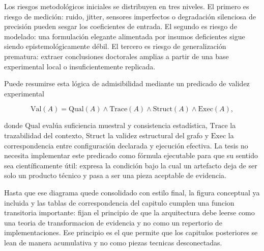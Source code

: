 Los riesgos metodológicos iniciales se distribuyen en tres niveles. El primero es riesgo de medición: ruido, jitter, sensores imperfectos o degradación silenciosa de precisión pueden sesgar los coeficientes de entrada. El segundo es riesgo de modelado: una formulación elegante alimentada por insumos deficientes sigue siendo epistemológicamente débil. El tercero es riesgo de generalización prematura: extraer conclusiones doctorales amplias a partir de una base experimental local o insuficientemente replicada.

Puede resumirse esta lógica de admisibilidad mediante un predicado de validez experimental

$$
\mathrm{Val}(A) = \mathrm{Qual}(A) \land \mathrm{Trace}(A) \land \mathrm{Struct}(A) \land \mathrm{Exec}(A),
$$

donde $\mathrm{Qual}$ evalúa suficiencia muestral y consistencia estadística, $\mathrm{Trace}$ la trazabilidad del contexto, $\mathrm{Struct}$ la validez estructural del grafo y $\mathrm{Exec}$ la correspondencia entre configuración declarada y ejecución efectiva. La tesis no necesita implementar este predicado como fórmula ejecutable para que su sentido sea científicamente útil: expresa la condición bajo la cual un artefacto deja de ser solo un producto técnico y pasa a ser una pieza aceptable de evidencia.


Hasta que ese diagrama quede consolidado con estilo final, la figura conceptual ya incluida y las tablas de correspondencia del capitulo cumplen una funcion transitoria importante: fijan el principio de que la arquitectura debe leerse como una teoria de transformacion de evidencia y no como un repertorio de implementaciones. Ese principio es el que permite que los capitulos posteriores se lean de manera acumulativa y no como piezas tecnicas desconectadas.
